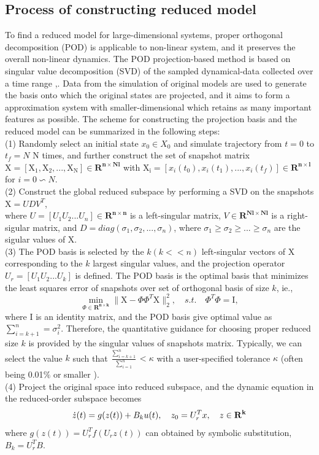 \documentclass[runningheads,a4paper]{llncs}
\theoremstyle{definition}
\theoremstyle{plain}
\begin{document}
\subsection{Process of constructing reduced model}
To find a reduced model for large-dimensional systems, proper orthogonal decomposition (POD) is applicable to non-linear system, and it preserves the overall non-linear dynamics. The POD projection-based method is based on singular value decomposition (SVD) of the sampled dynamical-data collected over a time range \cite{Pinnau2008},\cite{Stadlmayr2015}. Data from the simulation of original models are used to generate the basis onto which the original states are projected, and it aims to form a approximation system with smaller-dimensional which retains as many important features as possible. The scheme for constructing the projection basis and the reduced model can be summarized in the following steps:\\
(1) Randomly select an initial state $x_0 \in X_0$ and simulate trajectory from $t=0$ to $t_f= N$ N times, and further construct the set of snapshot matrix $\mathrm{X=[X_1, X_2,...,X_N]} \in \mathbf{R^{n \times Nl}} $ with $\mathrm{ X_i} =[x_i (t_0),x_i (t_1),...,x_i (t_f)] \in \mathbf{R^{n\times l}} $ for $i=0 \backsim N.$\\
(2) Construct the global reduced subspace by performing a SVD on the snapshots $ \mathrm{X}= UDV^T$,\\
where $U=[U_1 U_2 ...U_n] \in \mathbf{R^{n\times n}}$ is a left-singular matrix, $V \in \mathbf{R^{Nl\times Nl}}$ is a right-sigular matrix, and $D=diag(\sigma_1, \sigma_2, ...,\sigma_n)$, where $\sigma_1\geq \sigma_2\geq ...\geq \sigma_n$ are the sigular values of $\mathrm{X}$.  \\
(3) The POD basis is selected by the $k (k<<n)$ left-singular vectors of $\mathrm{X}$corresponding to the $k$ largest singular values, and the projection operator $U_r=[U_1 U_2 ... U_k] $ is defined. 
The POD basis is the optimal basis that minimizes the least squares error of snapshots over set of orthogonal basis of size $k$, ie.\cite{LIANG2002527},\\
\[
\min_{\Phi \in \mathbf{R^{n\times k}}}\parallel\mathrm{X}-\Phi \Phi^{T}\mathrm{X}\parallel_2^2,  \quad s.t. \quad \Phi^T  \Phi =\mathrm{I},
\]
where $\mathrm{I}$ is an identity matrix, and the POD basis give optimal value as $\sum_{i=k+1}^n=\sigma_i^2$. Therefore, the quantitative guidance for choosing proper reduced size $k$ is provided by the singular values of snapshots matrix. Typically, we can select the value $k$ such that $\frac{\sum_{i=k+1}^n}{\sum_{i=1}^n} < \kappa$ with a user-specified tolerance $\kappa$ (often being 0.01$\%$ or smaller \cite{Pinnau2008}).      
 \\
(4) Project the original space into reduced subspace, and the dynamic equation in the reduced-order subspace becomes
\[
\dot{z}(t)=g(z(t))+B_k u(t), \quad  z_0=U_r^T x, \quad    z\in \mathbf{R^k} \\ \label{xrode} 
\]
where $g(z(t))=U_r^T f(U_r z(t))$ can obtained by symbolic substitution, $B_k=U_r^T B$.
\
\end{document}
